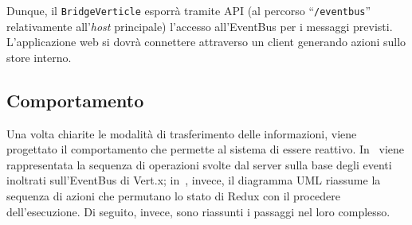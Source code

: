       Dunque, il \texttt{BridgeVerticle} esporrà tramite API (al percorso ``\texttt{/eventbus}'' relativamente all'\emph{host} principale) l'accesso all'EventBus per i messaggi previsti.
      L'applicazione web si dovrà connettere attraverso un client generando azioni sullo store interno.

    \subsection{Comportamento}

      Una volta chiarite le modalità di trasferimento delle informazioni, viene progettato il comportamento che permette al sistema di essere reattivo.
      In~ viene rappresentata la sequenza di operazioni svolte dal server sulla base degli eventi inoltrati sull'EventBus di Vert.x;
      in~, invece, il diagramma UML riassume la sequenza di azioni che permutano lo stato di Redux con il procedere dell'esecuzione.
      Di seguito, invece, sono riassunti i passaggi nel loro complesso.

